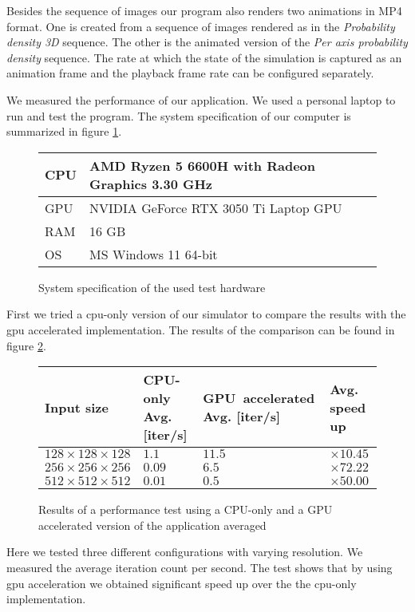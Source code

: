 Besides the sequence of images our program also renders two animations in MP4 format.
One is created from a sequence of images rendered as in the \textit{Probability density 3D} sequence.
The other is the animated version of the \textit{Per axis probability density} sequence.
The rate at which the state of the simulation is captured as an animation frame and the playback frame rate can be configured separately.

We measured the performance of our application.
We used a personal laptop to run and test the program.
The system specification of our computer is summarized in figure \ref{fig:system_spec}.
\begin{figure}
	\label{fig:system_spec}
	\begin{center}
		\begin{tabular}{|m{5em}||m{25em}|}
			\hline
			CPU & AMD Ryzen 5 6600H with Radeon Graphics            3.30 GHz\\
			\hline
			GPU & NVIDIA GeForce RTX 3050 Ti Laptop GPU\\		
			\hline
			RAM & 16 GB\\		
			\hline
			OS & MS Windows 11 64-bit\\		
			\hline
		\end{tabular}
		\caption{System specification of the used test hardware}
	\end{center}
\end{figure}
First we tried a \acrshort{cpu}-only version of our simulator to compare the results with the \acrshort{gpu} accelerated implementation.
The results of the comparison can be found in figure \ref{fig:performance_test}.
\begin{figure}
	\label{fig:performance_test}
	\begin{center}
	\begin{tabular}{|m{8em}||m{8em}| m{8em}| m{4em}|}
		\hline
		Input size & CPU-only Avg. [iter/s] & GPU~accelerated Avg. [iter/s] & Avg. speed up\\
		\hline
		$128 \times 128 \times 128$ & $1.1$ & $11.5$ & $\times 10.45$\\
		\hline
		$256 \times 256 \times 256$ & $0.09$ & $6.5$ & $\times 72.22$\\
		\hline
		$512 \times 512 \times 512$ & $0.01$ & $0.5$ & $\times 50.00$\\
		\hline
	\end{tabular}
	\caption{Results of a performance test using a CPU-only and a GPU accelerated version of the application averaged}
\end{center}
\end{figure}
Here we tested three different configurations with varying resolution.
We measured the average iteration count per second.
The test shows that by using \acrshort{gpu} acceleration we obtained significant speed up over the the \acrshort{cpu}-only implementation.






